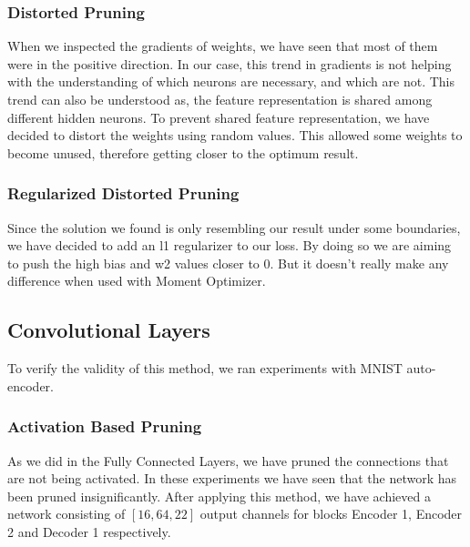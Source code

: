 \subsubsection{Distorted Pruning}

When we inspected the gradients of weights, we have seen that most of them were in the positive direction. In our case, this trend in gradients is not helping with the understanding of which neurons are necessary, and which are not. This trend can also be understood as, the feature representation is shared among different hidden neurons. 
To prevent shared feature representation, we have decided to distort the weights using random values. This allowed some weights to become unused, therefore getting closer to the optimum result.
\subsubsection{Regularized Distorted Pruning}
Since the solution we found is only resembling our result under some boundaries, we have decided to add an l1 regularizer to our loss. By doing so we are aiming to push the high bias and w2 values closer to 0. But it doesn't really make any difference when used with Moment Optimizer.

\subsection{Convolutional Layers}

To verify the validity of this method, we ran experiments with MNIST auto-encoder.
\subsubsection{Activation Based Pruning}
As we did in the Fully Connected Layers, we have pruned the connections that are not being activated. In these experiments we have seen that the network has been pruned insignificantly. After applying this method, we have achieved a network consisting of $[16, 64, 22]$ output channels for blocks Encoder 1, Encoder 2 and Decoder 1 respectively.

